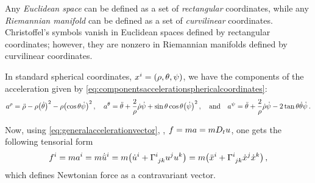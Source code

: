 \begin{note}
  Any \emph{Euclidean space} can be defined as a set of \emph{rectangular} coordinates, while any \emph{Riemannian manifold} can be defined as a set of \emph{curvilinear} coordinates. Christoffel's symbols vanish in Euclidean spaces defined by rectangular coordinates; however, they are nonzero in Riemannian manifolds defined by curvilinear coordinates.
\end{note}

\begin{example}
  In standard spherical coordinates, $\tvec\pos i = \tuple{\sxpos,\sypos,\szpos}$, we have the components of the acceleration given by \cref{eq:componentsaccelerationsphericalcoordinates}:
  \begin{equation*}
    \tvec\acc\sxpos = \ddt\sxpos - \sxpos\parens{\dt\sypos}^2 - \sxpos\parens{\cos\sypos\dt\szpos}^2              \,,\quad
    \tvec\acc\sypos = \ddt\sypos + \dfrac{2}{\sxpos}\dt\sxpos\dt\szpos + \sin\sypos\cos\sypos\parens{\dt\szpos}^2 \,,\quad\text{and}\quad
    \tvec\acc\szpos = \ddt\sypos + \dfrac{2}{\sxpos}\dt\sxpos\dt\szpos - 2\tan\sypos\dt\sypos\dt\szpos            \,.
  \end{equation*}
\end{example}
%
Now, using \cref{eq:generalaccelerationvector}, , $f = ma = m D_tu$, one gets the following tensorial form
%
\begin{equation}\label{eq:contravariantdefinitionofforce}
  \tvec\force i = \mass\tvec\acc i
                = \mass\tvec{\dbder\vel} i
                = \mass\parens{\tvec{\dt\vel}i + \skchris ijk\tvec\vel j\tvec\vel k}
                = \mass\parens{\tvec{\ddt\pos}i + \skchris ijk\tvec{\dt\pos} j\tvec{\dt\pos} k}\,,
\end{equation}
%
which defines Newtonian force as a contravariant vector.

